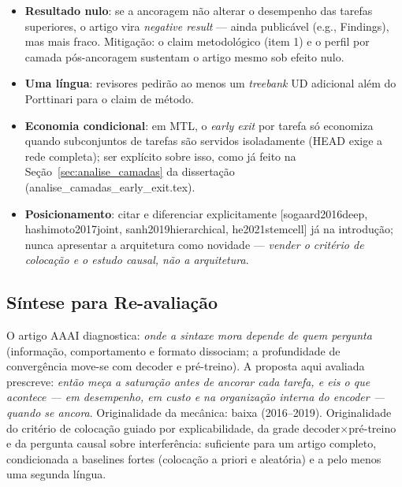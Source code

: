 \begin{itemize}
  \item \textbf{Resultado nulo}: se a ancoragem não alterar o desempenho das tarefas
        superiores, o artigo vira \textit{negative result} --- ainda publicável (e.g.,
        Findings), mas mais fraco. Mitigação: o claim metodológico (item 1) e o perfil por
        camada pós-ancoragem sustentam o artigo mesmo sob efeito nulo.
  \item \textbf{Uma língua}: revisores pedirão ao menos um \textit{treebank} UD adicional além
        do Porttinari para o claim de método.
  \item \textbf{Economia condicional}: em MTL, o \textit{early exit} por tarefa só economiza
        quando subconjuntos de tarefas são servidos isoladamente (HEAD exige a rede completa);
        ser explícito sobre isso, como já feito na Seção~\ref{sec:analise_camadas} da
        dissertação (analise\_camadas\_early\_exit.tex).
  \item \textbf{Posicionamento}: citar e diferenciar explicitamente
        [sogaard2016deep, hashimoto2017joint, sanh2019hierarchical, he2021stemcell] já na
        introdução; nunca apresentar a arquitetura como novidade --- \emph{vender o critério
        de colocação e o estudo causal, não a arquitetura}.
\end{itemize}

\subsection{Síntese para Re-avaliação}
\label{subsec:proposta_sintese}

O artigo AAAI diagnostica: \emph{onde a sintaxe mora depende de quem pergunta} (informação,
comportamento e formato dissociam; a profundidade de convergência move-se com decoder e
pré-treino). A proposta aqui avaliada prescreve: \emph{então meça a saturação antes de ancorar
cada tarefa, e eis o que acontece --- em desempenho, em custo e na organização interna do
encoder --- quando se ancora}. Originalidade da mecânica: baixa (2016--2019). Originalidade do
critério de colocação guiado por explicabilidade, da grade decoder$\times$pré-treino e da
pergunta causal sobre interferência: suficiente para um artigo completo, condicionada a
baselines fortes (colocação a priori e aleatória) e a pelo menos uma segunda língua.
